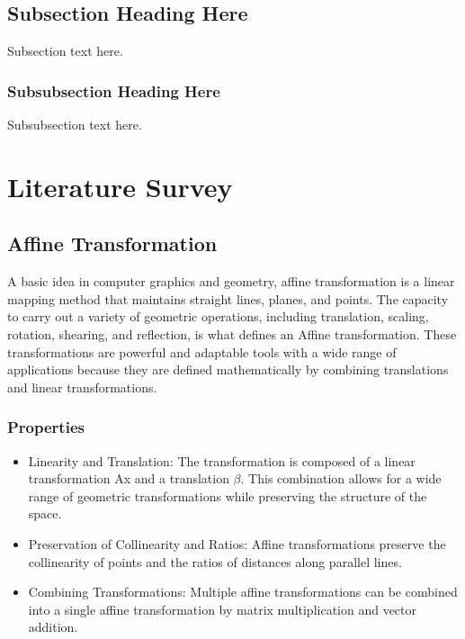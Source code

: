 \documentclass[conference]{IEEEtran}
\begin{document}
\subsection{Subsection Heading Here}
Subsection text here.
\subsubsection{Subsubsection Heading Here}
Subsubsection text here.

\section{Literature Survey}
\subsection{Affine Transformation}
A basic idea in computer graphics and geometry, affine transformation is a linear mapping method that maintains straight lines, planes, and points. The capacity to carry out a variety of geometric operations, including translation, scaling, rotation, shearing, and reflection, is what defines an Affine transformation. These transformations are powerful and adaptable tools with a wide range of applications because they are defined mathematically by combining translations and linear transformations.

\subsubsection{Properties}

\begin{itemize}
  \item Linearity and Translation:  The transformation is composed of a linear transformation  Ax and a translation $\beta$.  This combination allows for a wide range of geometric transformations while preserving the structure of the space.

  \item Preservation of Collinearity and Ratios:  Affine transformations preserve the collinearity of points and the ratios of distances along parallel lines.

  \item Combining Transformations:  Multiple affine transformations can be combined into a single affine transformation by matrix multiplication and vector addition.
\end{itemize}
\end{document}
